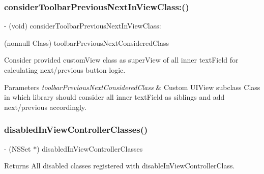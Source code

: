 \subsubsection{\texorpdfstring{consider\+Toolbar\+Previous\+Next\+In\+View\+Class\+:()}{considerToolbarPreviousNextInViewClass:()}\hspace{0.1cm}{\footnotesize\ttfamily [3/3]}}
{\footnotesize\ttfamily -\/ (void) consider\+Toolbar\+Previous\+Next\+In\+View\+Class\+: \begin{DoxyParamCaption}\item[{(nonnull Class)}]{toolbar\+Previous\+Next\+Considered\+Class }\end{DoxyParamCaption}}

Consider provided custom\+View class as super\+View of all inner text\+Field for calculating next/previous button logic.


\begin{DoxyParams}{Parameters}
{\em toolbar\+Previous\+Next\+Considered\+Class} & Custom U\+I\+View subclass Class in which library should consider all inner text\+Field as siblings and add next/previous accordingly. \\
\hline
\end{DoxyParams}
\mbox{\label{interface_i_q_keyboard_manager_a37a563ed75b8487bf8378dcabfd27a70}} 
\subsubsection{\texorpdfstring{disabled\+In\+View\+Controller\+Classes()}{disabledInViewControllerClasses()}\hspace{0.1cm}{\footnotesize\ttfamily [1/3]}}
{\footnotesize\ttfamily -\/ (N\+S\+Set $\ast$) disabled\+In\+View\+Controller\+Classes \begin{DoxyParamCaption}{ }\end{DoxyParamCaption}}

Returns All disabled classes registered with disable\+In\+View\+Controller\+Class. \mbox{\label{interface_i_q_keyboard_manager_a3549c4c0b46b18854a0c3467276c0e3a}} 
